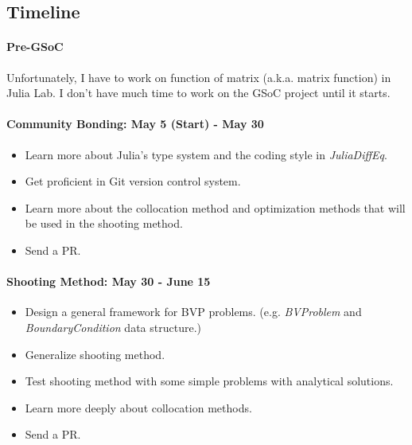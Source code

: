 \documentclass[a4paper,12pt,onecolumn]{article}
\begin{document}
\subsection{Timeline}
\paragraph{Pre-GSoC} %
\label{par:pre_gsoc}
Unfortunately, I have to work on function of matrix (a.k.a. matrix function) in Julia Lab.
I don't have much time to work on the GSoC project until it starts.

\paragraph{Community Bonding: May 5 (Start) - May 30} %
\label{par:community_bonding}
\begin{itemize}
	\item Learn more about Julia's type system and the coding style in \textit{JuliaDiffEq}.
	\item Get proficient in Git version control system.
	\item Learn more about the collocation method and optimization methods that will be
	used in the shooting method.
	\item Send a PR.
\end{itemize}

\paragraph{Shooting Method: May 30 - June 15} %
\label{par:shooting_method_may_30_june_15}
\begin{itemize}
	\item Design a general framework for BVP problems. (e.g. \textit{BVProblem} and \textit{
	BoundaryCondition} data structure.)
	\item Generalize shooting method.
	\item Test shooting method with some simple problems with analytical solutions.
	\item Learn more deeply about collocation methods.
	\item Send a PR.
\end{itemize}
\end{document}
